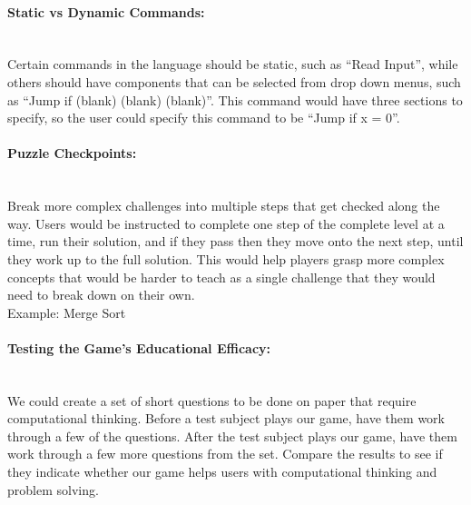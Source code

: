 \paragraph{Static vs Dynamic Commands:} ~\\
Certain commands in the language should be static, such as “Read Input”, while others should 
have components that can be selected from drop down menus, such as “Jump if (blank) (blank) 
(blank)”. This command would have three sections to specify, so the user could specify this 
command to be “Jump if x = 0”.\\

\paragraph{Puzzle Checkpoints:} ~\\
Break more complex challenges into multiple steps that get checked along the way. Users would 
be instructed to complete one step of the complete level at a time, run their solution, and if they 
pass then they move onto the next step, until they work up to the full solution. This would help 
players grasp more complex concepts that would be harder to teach as a single challenge that 
they would need to break down on their own.\\

Example: Merge Sort

\hspace{10mm} 

\hspace{10mm} 

\hspace{10mm} 


\paragraph{Testing the Game's Educational Efficacy:} ~\\
We could create a set of short questions to be done on paper that require computational thinking. 
Before a test subject plays our game, have them work through a few of the questions. After the test 
subject plays our game, have them work through a few more questions from the set. Compare the 
results to see if they indicate whether our game helps users with computational thinking and problem 
solving.\\

